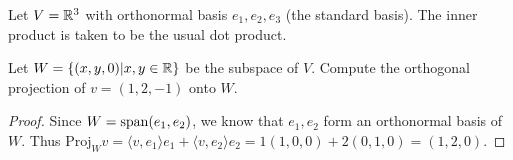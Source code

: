 \documentclass{amsart}
\begin{document}
	
\vspace{2em}


Let $V=\mathbb{R}^3$ with orthonormal basis $e_1,e_2,e_3$ (the standard basis). The inner product is taken to be the usual dot product.

Let $W=\{(x,y,0)|x,y\in\mathbb{R}\}$ be the subspace of $V$. Compute the orthogonal projection of $v=(1,2,-1)$ onto $W$.

\begin{proof}
 Since $W=\operatorname{span}(e_1,e_2)$, we know that $e_1,e_2$ form an orthonormal basis of $W$. Thus 
 $\text{Proj}_W v=\langle v,e_1\rangle e_1+\langle v,e_2\rangle e_2=1(1,0,0)+2(0,1,0)=(1,2,0)$.
	
\end{proof}

%
%
\end{document}
